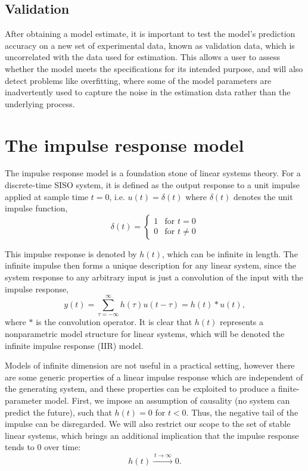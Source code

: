 \subsection{Validation}

After obtaining a model estimate, it is important to test the model's prediction accuracy on a new set of experimental data, known as validation data, which is uncorrelated with the data used for estimation. This allows a user to assess whether the model meets the specifications for its intended purpose, and will also detect problems like overfitting, where some of the model parameters are inadvertently used to capture the noise in the estimation data rather than the underlying process.   

\section{The impulse response model}

The impulse response model is a foundation stone of linear systems theory. For a discrete-time SISO system, it is defined as the output response to a unit impulse applied at sample time $t=0$, i.e. $u(t) = \delta(t)$ where $\delta(t)$ denotes the unit impulse function,
\begin{equation}
\delta(t) = \begin{cases} 1 & \text{for } t = 0 \\
0 & \text{for } t \neq 0 \end{cases}
\end{equation}

This impulse response is denoted by $h(t)$, which can be infinite in length. The infinite impulse then forms a unique description for any linear system, since the system response to any arbitrary input is just a convolution of the input with the impulse response,
\begin{equation}
\label{eq:IIRdefn}
y(t) = \sum_{\tau=-\infty}^{\infty} h(\tau) u(t-\tau) = h(t) * u(t),
\end{equation}
where $*$ is the convolution operator. It is clear that $h(t)$ represents a nonparametric model structure for linear systems, which will be denoted the infinite impulse response (IIR) model.

Models of infinite dimension are not useful in a practical setting, however there are some generic properties of a linear impulse response which are independent of the generating system, and these properties can be exploited to produce a finite-parameter model. First, we impose an assumption of causality (no system can predict the future), such that $h(t) = 0$ for $t<0$. Thus, the negative tail of the impulse can be disregarded. We will also restrict our scope to the set of stable linear systems, which brings an additional implication that the impulse response tends to 0 over time:
\begin{equation}
h(t) \xrightarrow{\: t \to \infty \:} 0.
\end{equation} 

